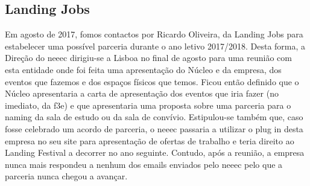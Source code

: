 
\subsection{Landing Jobs}

Em agosto de 2017, fomos contactos por Ricardo Oliveira, da Landing Jobs para estabelecer uma possível parceria durante o ano letivo 2017/2018. Desta forma, a Direção do \acrshort{neeec} dirigiu-se a Lisboa no final de agosto para uma reunião com esta entidade onde foi feita uma apresentação do Núcleo e da empresa, dos eventos que fazemos e dos espaços físicos que temos. Ficou então definido que o Núcleo apresentaria a carta de apresentação dos eventos que iria fazer (no imediato, da \acrshort{f3e}) e que apresentaria uma proposta sobre uma parceria para o naming da sala de estudo ou da sala de convívio. Estipulou-se também que, caso fosse celebrado um acordo de parceria, o \acrshort{neeec} passaria a utilizar o plug in desta empresa no seu site para apresentação de ofertas de trabalho e teria direito ao Landing Festival a decorrer no ano seguinte. Contudo, após a reunião, a empresa nunca mais respondeu a nenhum dos emails enviados pelo \acrshort{neeec} pelo que a parceria nunca chegou a avançar.